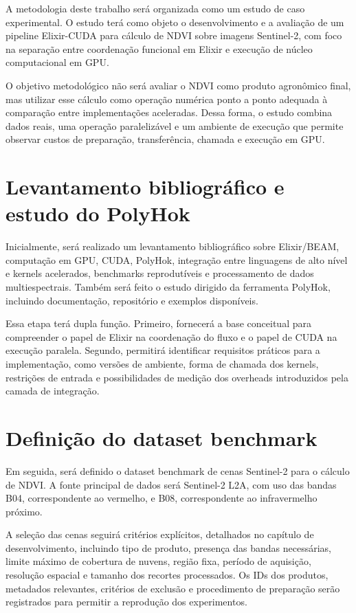 \documentclass[tcc,capa]{texufpel}
\begin{document}
A metodologia deste trabalho será organizada como um estudo de caso experimental. O estudo terá como objeto o desenvolvimento e a avaliação de um pipeline Elixir-CUDA para cálculo de NDVI sobre imagens Sentinel-2, com foco na separação entre coordenação funcional em Elixir e execução de núcleo computacional em GPU.

O objetivo metodológico não será avaliar o NDVI como produto agronômico final, mas utilizar esse cálculo como operação numérica ponto a ponto adequada à comparação entre implementações aceleradas. Dessa forma, o estudo combina dados reais, uma operação paralelizável e um ambiente de execução que permite observar custos de preparação, transferência, chamada e execução em GPU.

\section{Levantamento bibliográfico e estudo do PolyHok}

Inicialmente, será realizado um levantamento bibliográfico sobre Elixir/BEAM, computação em GPU, CUDA, PolyHok, integração entre linguagens de alto nível e kernels acelerados, benchmarks reprodutíveis e processamento de dados multiespectrais. Também será feito o estudo dirigido da ferramenta PolyHok, incluindo documentação, repositório e exemplos disponíveis.

Essa etapa terá dupla função. Primeiro, fornecerá a base conceitual para compreender o papel de Elixir na coordenação do fluxo e o papel de CUDA na execução paralela. Segundo, permitirá identificar requisitos práticos para a implementação, como versões de ambiente, forma de chamada dos kernels, restrições de entrada e possibilidades de medição dos overheads introduzidos pela camada de integração.

\section{Definição do dataset benchmark}

Em seguida, será definido o dataset benchmark de cenas Sentinel-2 para o cálculo de NDVI. A fonte principal de dados será Sentinel-2 L2A, com uso das bandas B04, correspondente ao vermelho, e B08, correspondente ao infravermelho próximo.

A seleção das cenas seguirá critérios explícitos, detalhados no capítulo de desenvolvimento, incluindo tipo de produto, presença das bandas necessárias, limite máximo de cobertura de nuvens, região fixa, período de aquisição, resolução espacial e tamanho dos recortes processados. Os IDs dos produtos, metadados relevantes, critérios de exclusão e procedimento de preparação serão registrados para permitir a reprodução dos experimentos.
\end{document}
